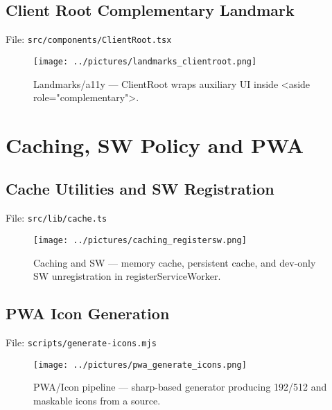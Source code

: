 \documentclass[11pt,a4paper]{article}
\begin{document}


\subsection*{Client Root Complementary Landmark}
\noindent File: \texttt{src/components/ClientRoot.tsx}

\begin{figure}[h!]
  \centering
  \texttt{[image: ../pictures/landmarks\_clientroot.png]}
  \caption{Landmarks/a11y — ClientRoot wraps auxiliary UI inside <aside role="complementary">.}
\end{figure}



\section{Caching, SW Policy and PWA}
\subsection*{Cache Utilities and SW Registration}
\noindent File: \texttt{src/lib/cache.ts}

\begin{figure}[h!]
  \centering
  \texttt{[image: ../pictures/caching\_registersw.png]}
  \caption{Caching and SW — memory cache, persistent cache, and dev-only SW unregistration in registerServiceWorker.}
\end{figure}



\subsection*{PWA Icon Generation}
\noindent File: \texttt{scripts/generate-icons.mjs}

\begin{figure}[h!]
  \centering
  \texttt{[image: ../pictures/pwa\_generate\_icons.png]}
  \caption{PWA/Icon pipeline — sharp-based generator producing 192/512 and maskable icons from a source.}
\end{figure}


\end{document}
